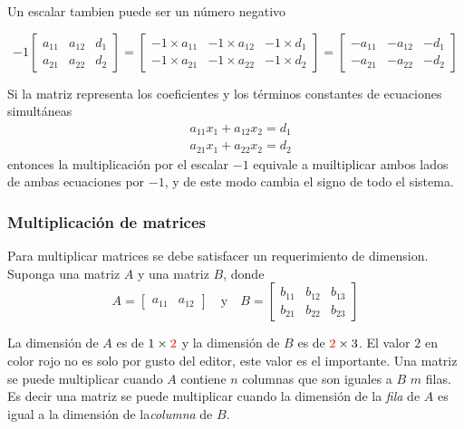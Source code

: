 Un escalar tambien puede ser un número negativo 
\begin{ejemplo}
    \[
    -1\begin{bmatrix}
        a_{11} & a_{12} & d_1\\
        a_{21} & a_{22} & d_2
    \end{bmatrix}
    = 
    \begin{bmatrix}
        -1\times a_{11} & -1\times a_{12} & -1\times d_1 \\
        -1\times a_{21} & -1\times a_{22} & -1\times d_2
    \end{bmatrix}
    = 
    \begin{bmatrix}
        -a_{11} & -a_{12} & -d_1\\
        -a_{21} & -a_{22} & -d_2
    \end{bmatrix}
    \]
\end{ejemplo}
Si la matriz representa los coeficientes y los términos constantes de ecuaciones simultáneas 
$$
\begin{aligned}
    & a_{11}x_1 + a_{12}x_2 = d_1 \\
    & a_{21}x_1 + a_{22}x_2 = d_2
\end{aligned}
$$
entonces la multiplicación por el escalar \(-1\) equivale a muiltiplicar ambos lados de ambas ecuaciones por \(-1\), y de este modo cambia el signo de todo el sistema.

\subsubsection{Multiplicación de matrices}

Para multiplicar matrices se debe satisfacer un requerimiento de dimension. Suponga una matriz \(A\) y una matriz \(B\), donde 
\[
A = 
\begin{bmatrix}
    a_{11} & a_{12}    
\end{bmatrix}
\quad
\text{y} 
\quad
B = 
\begin{bmatrix}
    b_{11} & b_{12} & b_{13} \\
    b_{21} & b_{22} & b_{23}
\end{bmatrix}
\]

La dimensión de \(A\) es de \(1 \times \color{red}2\) y la dimensión de \(B\) es de \({\color{red}2} \times 3\). El valor \(2\) en color rojo no es solo por gusto del editor, este valor es el importante. Una matriz se puede multiplicar cuando \(A\) contiene \(n\) columnas que son iguales a \(B\) \(m\) filas. Es decir una matriz se puede multiplicar cuando la dimensión de la \textit{fila} de \(A\) es igual a la dimensión de la\textit{columna} de \(B\).

